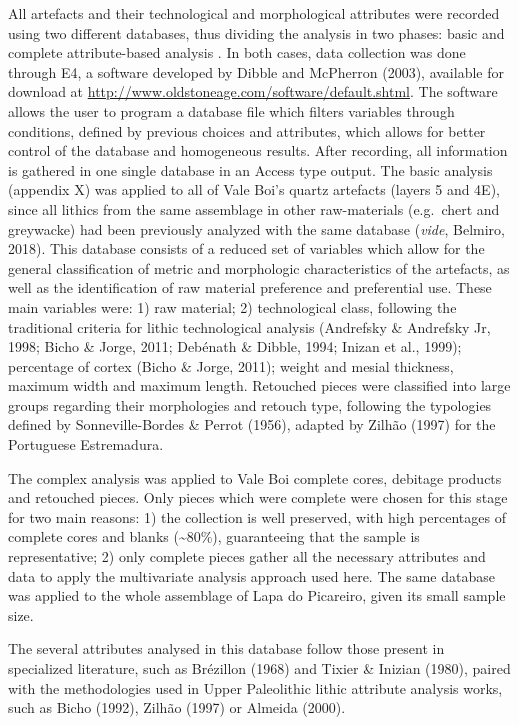 \documentclass[12pt,twoside]{reedthesis}
\begin{document}
All artefacts and their technological and morphological attributes were recorded using two different databases, thus dividing the analysis in two phases: basic and complete attribute-based analysis .
In both cases, data collection was done through E4, a software developed by Dibble and McPherron (2003), available for download at \url{http://www.oldstoneage.com/software/default.shtml}. The software allows the user to program a database file which filters variables through conditions, defined by previous choices and attributes, which allows for better control of the database and homogeneous results. After recording, all information is gathered in one single database in an Access type output.
The basic analysis (appendix X) was applied to all of Vale Boi's quartz artefacts (layers 5 and 4E), since all lithics from the same assemblage in other raw-materials (e.g.~chert and greywacke) had been previously analyzed with the same database (\emph{vide}, Belmiro, 2018). This database consists of a reduced set of variables which allow for the general classification of metric and morphologic characteristics of the artefacts, as well as the identification of raw material preference and preferential use. These main variables were: 1) raw material; 2) technological class, following the traditional criteria for lithic technological analysis (Andrefsky \& Andrefsky Jr, 1998; Bicho \& Jorge, 2011; Debénath \& Dibble, 1994; Inizan et al., 1999); percentage of cortex (Bicho \& Jorge, 2011); weight and mesial thickness, maximum width and maximum length. Retouched pieces were classified into large groups regarding their morphologies and retouch type, following the typologies defined by Sonneville-Bordes \& Perrot (1956), adapted by Zilhão (1997) for the Portuguese Estremadura.

The complex analysis was applied to Vale Boi complete cores, debitage products and retouched pieces. Only pieces which were complete were chosen for this stage for two main reasons: 1) the collection is well preserved, with high percentages of complete cores and blanks (\textasciitilde80\%), guaranteeing that the sample is representative; 2) only complete pieces gather all the necessary attributes and data to apply the multivariate analysis approach used here. The same database was applied to the whole assemblage of Lapa do Picareiro, given its small sample size.

The several attributes analysed in this database follow those present in specialized literature, such as Brézillon (1968) and Tixier \& Inizian (1980), paired with the methodologies used in Upper Paleolithic lithic attribute analysis works, such as Bicho (1992), Zilhão (1997) or Almeida (2000).
\end{document}
